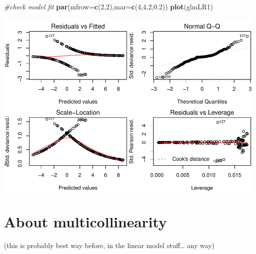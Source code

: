 \documentclass[
]{book}
\newenvironment{Shaded}{\begin{snugshade}}{\end{snugshade}}
\newcommand{\CommentTok}[1]{\textcolor[rgb]{0.56,0.35,0.01}{\textit{#1}}}
\newcommand{\DataTypeTok}[1]{\textcolor[rgb]{0.13,0.29,0.53}{#1}}
\newcommand{\DecValTok}[1]{\textcolor[rgb]{0.00,0.00,0.81}{#1}}
\newcommand{\FloatTok}[1]{\textcolor[rgb]{0.00,0.00,0.81}{#1}}
\newcommand{\KeywordTok}[1]{\textcolor[rgb]{0.13,0.29,0.53}{\textbf{#1}}}
\newcommand{\NormalTok}[1]{#1}
\begin{document}
\begin{Shaded}
\begin{Highlighting}[]
\CommentTok{#check model fit}
\KeywordTok{par}\NormalTok{(}\DataTypeTok{mfrow=}\KeywordTok{c}\NormalTok{(}\DecValTok{2}\NormalTok{,}\DecValTok{2}\NormalTok{),}\DataTypeTok{mar=}\KeywordTok{c}\NormalTok{(}\DecValTok{4}\NormalTok{,}\DecValTok{4}\NormalTok{,}\DecValTok{2}\NormalTok{,}\FloatTok{0.2}\NormalTok{))}
\KeywordTok{plot}\NormalTok{(glmLR1)}
\end{Highlighting}
\end{Shaded}

\includegraphics{ECOMODbook_files/figure-latex/unnamed-chunk-13-2.pdf}

\hypertarget{about-multicollinearity}{%
\section{About multicollinearity}\label{about-multicollinearity}}

(this is probably best way before, in the linear model stuff\ldots{} any way)
\end{document}
